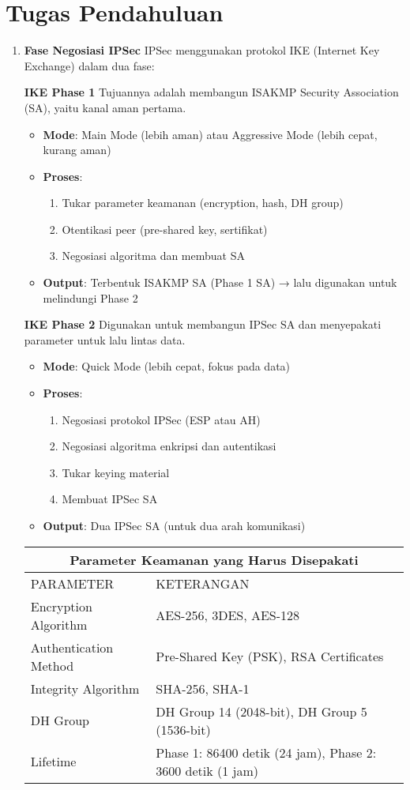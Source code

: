 \section{Tugas Pendahuluan}
\begin{enumerate}
	\item \textbf{Fase Negosiasi IPSec}
	IPSec menggunakan protokol IKE (Internet Key Exchange) dalam dua fase:

	\textbf{IKE Phase 1}
	Tujuannya adalah membangun ISAKMP Security Association (SA), yaitu kanal aman pertama.
	\begin{itemize}
		\item \textbf{Mode}: Main Mode (lebih aman) atau Aggressive Mode (lebih cepat, kurang aman)
		\item \textbf{Proses}:
		\begin{enumerate}
			\item Tukar parameter keamanan (encryption, hash, DH group)
			\item Otentikasi peer (pre-shared key, sertifikat)
			\item Negosiasi algoritma dan membuat SA
		\end{enumerate}
		\item \textbf{Output}: Terbentuk ISAKMP SA (Phase 1 SA) → lalu digunakan untuk melindungi Phase 2
	\end{itemize}

	\textbf{IKE Phase 2}
	Digunakan untuk membangun IPSec SA dan menyepakati parameter untuk lalu lintas data.
	\begin{itemize}
		\item \textbf{Mode}: Quick Mode (lebih cepat, fokus pada data)
		\item \textbf{Proses}:
		\begin{enumerate}
			\item Negosiasi protokol IPSec (ESP atau AH)
			\item Negosiasi algoritma enkripsi dan autentikasi
			\item Tukar keying material
			\item Membuat IPSec SA
		\end{enumerate}
		\item \textbf{Output}: Dua IPSec SA (untuk dua arah komunikasi)
	\end{itemize}
	\begin{center}
		\begin{tabular}{ |p{5cm}||p{7cm}| }
			\hline
			\multicolumn{2}{|c|}{Parameter Keamanan yang Harus Disepakati} \\
			\hline
			PARAMETER & KETERANGAN \\
			\hline
			Encryption Algorithm   & AES-256, 3DES, AES-128 \\
			Authentication Method & Pre-Shared Key (PSK), RSA Certificates \\
			Integrity Algorithm & SHA-256, SHA-1 \\
			DH Group & DH Group 14 (2048-bit), DH Group 5 (1536-bit) \\
			Lifetime & Phase 1: 86400 detik (24 jam), Phase 2: 3600 detik (1 jam) \\
			\hline
		\end{tabular}
	\end{center}


\end{enumerate}
